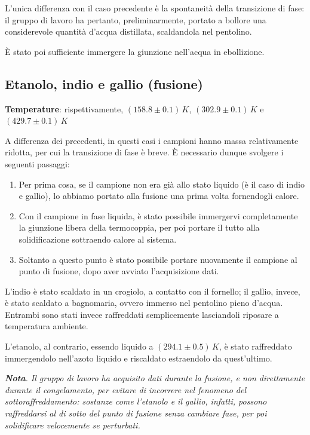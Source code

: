 \documentclass{article}
\begin{document}
L'unica differenza con il caso precedente è la spontaneità
della transizione di fase:
il gruppo di lavoro ha pertanto, preliminarmente, portato
a bollore una considerevole quantità d'acqua distillata,
scaldandola nel pentolino.

È stato poi sufficiente immergere la giunzione nell'acqua
in ebollizione.

\pagebreak
\subsection*{Etanolo, indio e gallio (fusione)}
\textbf{Temperature}: rispettivamente, $(158.8\pm0.1)\,\unit{K}$,
$(302.9\pm0.1)\,\unit{K}$ e $(429.7\pm0.1)\,\unit{K}$
\vspace{1mm}

A differenza dei precedenti, in questi casi i campioni
hanno massa relativamente ridotta, per cui la transizione
di fase è breve. È necessario dunque svolgere i seguenti passaggi:
\begin{enumerate}
  \item
    Per prima cosa, se il campione non era già allo stato liquido
    (è il caso di indio e gallio), lo abbiamo portato alla fusione
    una prima volta fornendogli calore.
  \item
    Con il campione in fase liquida, è stato possibile immergervi
    completamente la giunzione libera della termocoppia, per poi
    portare il tutto alla solidificazione sottraendo calore al
    sistema.
  \item
    Soltanto a questo punto è stato possibile portare nuovamente
    il campione al punto di fusione, dopo aver avviato l'acquisizione
    dati.
\end{enumerate}
L'indio è stato scaldato in un crogiolo, a contatto con il
fornello; il gallio, invece, è stato scaldato a bagnomaria,
ovvero immerso nel pentolino pieno d'acqua.
Entrambi sono stati invece raffreddati semplicemente
lasciandoli riposare a temperatura ambiente.

L'etanolo, al contrario, essendo liquido a $(294.1\pm0.5)\,\unit{K}$,
è stato raffreddato immergendolo nell'azoto liquido e riscaldato
estraendolo da quest'ultimo.

\vspace{2mm}
\emph{\textbf{Nota}. Il gruppo di lavoro ha acquisito dati durante la
fusione, e non direttamente durante il congelamento, per evitare di
incorrere nel fenomeno del sottoraffreddamento: sostanze come
l'etanolo e il gallio, infatti, possono raffreddarsi al di sotto del
punto di fusione senza cambiare fase, per poi solidificare velocemente
se perturbati.}
\end{document}
